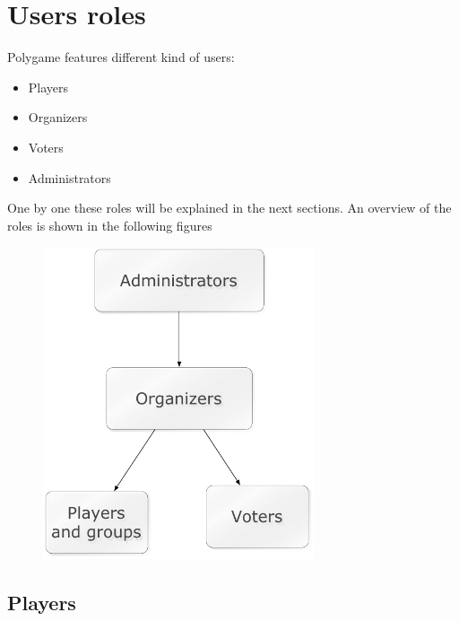\section{Users roles}
\label{users}

Polygame features different kind of users:
\begin{itemize}
	\item Players
	\item Organizers
	\item Voters
	\item Administrators
\end{itemize}

One by one these roles will be explained in the next sections.
An overview of the roles is shown in the following figures
  \begin{figure}[htbp]
    \begin{center}
      \includegraphics[width=8cm]{../img/Users.pdf}
    \end{center}
  \end{figure}

\subsection{Players}
